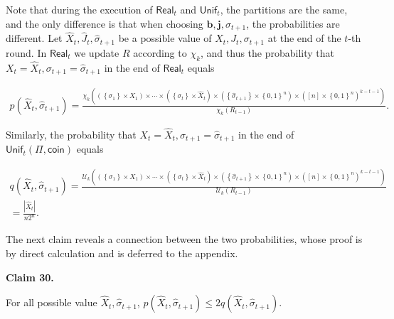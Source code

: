 Note that during the execution of $\mathsf{Real}_{t}$ and $\mathsf{Unif}_{t}$, the partitions are the same, and the only difference is that when choosing $\bm{b,j},\sigma_{t+1}$, the probabilities are different.
Let $\widehat{X}_{t},\widehat{J}_{t},\widehat{\sigma}_{t+1}$ be a possible value of $X_{t},J_{t},\sigma_{t+1}$ at the end of the $t$-th round.
In $\mathsf{Real}_{t}$ we update $R$ according to $\chi_{k}$,
and thus the probability that $X_{t}=\widehat{X}_{t},\sigma_{t+1}=\widehat{\sigma}_{t+1}$ in the end of $\mathsf{Real}_{t}$ equals\par


\[\begin{gathered}
p(\widehat{X}_{t},\widehat{\sigma}_{t+1})=\frac{\chi_{k}((\left\{\sigma_{1}\right\}\times X_{1})\times\cdots\times(\left\{\sigma_{t}\right\}\times\widehat{X}_{t})\times(\left\{\widehat{\sigma}_{t+1}\right\}\times\left\{0,1\right\}^{n})\times([n]\times\left\{0,1\right\}^{n})^{k-t-1})}{\chi_{k}(R_{t-1})}.
\end{gathered}\]


Similarly, the probability that $X_{t}=\widehat{X}_{t},\sigma_{t+1}=\widehat{\sigma}_{t+1}$ in the end of $\mathsf{Unif}_{t}(\Pi,\mathsf{coin})$ equals\par


\[\begin{gathered}
\displaystyle q(\widehat{X}_{t},\widehat{\sigma}_{t+1})= \displaystyle\frac{\mathcal{U}_{k}((\left\{\sigma_{1}\right\}\times X_{1})\times\cdots\times(\left\{\sigma_{t}\right\}\times\widehat{X}_{t})\times(\left\{\widehat{\sigma}_{t+1}\right\}\times\left\{0,1\right\}^{n})\times([n]\times\left\{0,1\right\}^{n})^{k-t-1})}{\mathcal{U}_{k}(R_{t-1})} \\
\displaystyle= \displaystyle\frac{|\widehat{X}_{t}|}{n2^{n}}.
\end{gathered}\]


The next claim reveals a connection between the two probabilities,
whose proof is by direct calculation and is deferred to the appendix.\par





\par\medskip\noindent\textbf{
Claim 30. 
}\par



For all possible value $\widehat{X}_{t},\widehat{\sigma}_{t+1}$, $p(\widehat{X}_{t},\widehat{\sigma}_{t+1})\leq 2q(\widehat{X}_{t},\widehat{\sigma}_{t+1})$.\par



